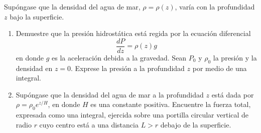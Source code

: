 \item Supóngase que la densidad del agua de mar, $\rho = \rho(z)$, varía con la profundidad $z$ bajo la superficie.
    \begin{enumerate}
        \item[(a)] Demuestre que la presión hidrostática está regida por la ecuación diferencial
        \[ \frac{dP}{dz} = \rho(z)g \]
        en donde $g$ es la aceleración debida a la gravedad. Sean $P_0$ y $\rho_0$ la presión y la densidad en $z = 0$. Exprese la presión a la profundidad $z$ por medio de una integral.
        \item[(b)] Supóngase que la densidad del agua de mar a la profundidad $z$ está dada por $\rho = \rho_0 e^{z/H}$, en donde $H$ es una constante positiva. Encuentre la fuerza total, expresada como una integral, ejercida sobre una portilla circular vertical de radio $r$ cuyo centro está a una distancia $L > r$ debajo de la superficie.
    \end{enumerate}
